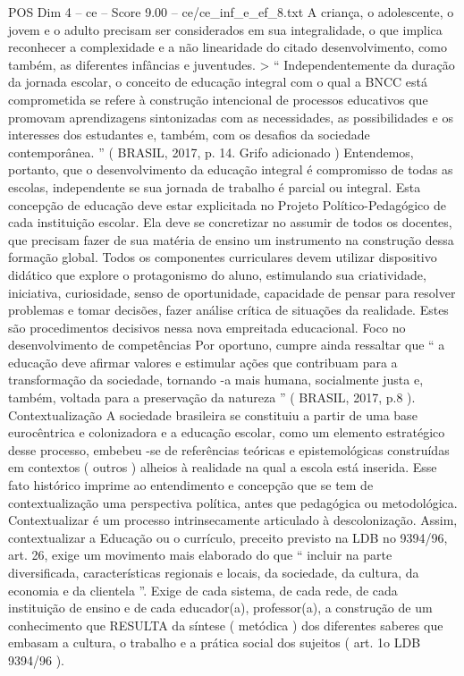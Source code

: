 \begin{textsample}{POS Dim 4 – ce – Score 9.00 – ce/ce\_inf\_e\_ef\_8.txt}
A criança, o adolescente, o jovem e o adulto precisam ser considerados em sua integralidade, o que implica reconhecer a complexidade e a não linearidade do citado desenvolvimento, como também, as diferentes infâncias e juventudes. > “ Independentemente da duração da jornada escolar, o conceito de educação integral com o qual a BNCC está comprometida se refere à construção intencional de processos educativos que promovam aprendizagens sintonizadas com as necessidades, as possibilidades e os interesses dos estudantes e, também, com os desafios da sociedade contemporânea. ” ( BRASIL, 2017, p. 14.
Grifo adicionado ) Entendemos, portanto, que o desenvolvimento da educação integral é compromisso de todas as escolas, independente se sua jornada de trabalho é parcial ou integral.
Esta concepção de educação deve estar explicitada no Projeto Político-Pedagógico de cada instituição escolar.
Ela deve se concretizar no assumir de todos os docentes, que precisam fazer de sua matéria de ensino um instrumento na construção dessa formação global.
Todos os componentes curriculares devem utilizar dispositivo didático que explore o protagonismo do aluno, estimulando sua criatividade, iniciativa, curiosidade, senso de oportunidade, capacidade de pensar para resolver problemas e tomar decisões, fazer análise crítica de situações da realidade.
Estes são procedimentos decisivos nessa nova empreitada educacional.
Foco no desenvolvimento de competências Por oportuno, cumpre ainda ressaltar que “ a educação deve afirmar valores e estimular ações que contribuam para a transformação da sociedade, tornando -a mais humana, socialmente justa e, também, voltada para a preservação da natureza ” ( BRASIL, 2017, p.8 ).
Contextualização A sociedade brasileira se constituiu a partir de uma base eurocêntrica e colonizadora e a educação escolar, como um elemento estratégico desse processo, embebeu -se de referências teóricas e epistemológicas construídas em contextos ( outros ) alheios à realidade na qual a escola está inserida.
Esse fato histórico imprime ao entendimento e concepção que se tem de contextualização uma perspectiva política, antes que pedagógica ou metodológica.
Contextualizar é um processo intrinsecamente articulado à descolonização.
Assim, contextualizar a Educação ou o currículo, preceito previsto na LDB no 9394/96, art. 26, exige um movimento mais elaborado do que “ incluir na parte diversificada, características regionais e locais, da sociedade, da cultura, da economia e da clientela ”.
Exige de cada sistema, de cada rede, de cada instituição de ensino e de cada educador(a), professor(a), a construção de um conhecimento que RESULTA da síntese ( metódica ) dos diferentes saberes que embasam a cultura, o trabalho e a prática social dos sujeitos ( art. 1o LDB 9394/96 ).

\end{textsample}
